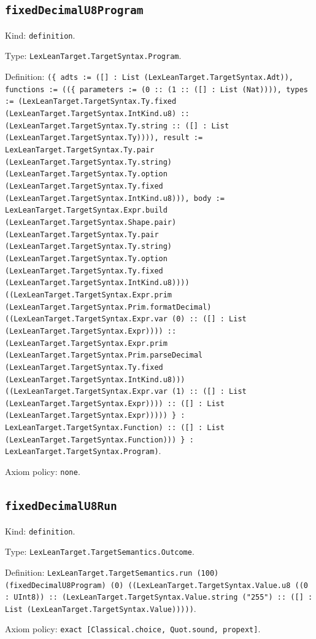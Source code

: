 \documentclass[11pt]{article}
\begin{document}
\subsection*{\texttt{fixedDecimalU8Program}}
\noindent Kind: \texttt{definition}.\par
\noindent Type: \texttt{LexLeanTarget.TargetSyntax.Program}.\par
\noindent Definition: \texttt{(\{ adts := ([] : List (LexLeanTarget.TargetSyntax.Adt)), functions := ((\{ parameters := (0 :: (1 :: ([] : List (Nat)))), types := (LexLeanTarget.TargetSyntax.Ty.fixed (LexLeanTarget.TargetSyntax.IntKind.u8) :: (LexLeanTarget.TargetSyntax.Ty.string :: ([] : List (LexLeanTarget.TargetSyntax.Ty)))), result := LexLeanTarget.TargetSyntax.Ty.pair (LexLeanTarget.TargetSyntax.Ty.string) (LexLeanTarget.TargetSyntax.Ty.option (LexLeanTarget.TargetSyntax.Ty.fixed (LexLeanTarget.TargetSyntax.IntKind.u8))), body := LexLeanTarget.TargetSyntax.Expr.build (LexLeanTarget.TargetSyntax.Shape.pair) (LexLeanTarget.TargetSyntax.Ty.pair (LexLeanTarget.TargetSyntax.Ty.string) (LexLeanTarget.TargetSyntax.Ty.option (LexLeanTarget.TargetSyntax.Ty.fixed (LexLeanTarget.TargetSyntax.IntKind.u8)))) ((LexLeanTarget.TargetSyntax.Expr.prim (LexLeanTarget.TargetSyntax.Prim.formatDecimal) ((LexLeanTarget.TargetSyntax.Expr.var (0) :: ([] : List (LexLeanTarget.TargetSyntax.Expr)))) :: (LexLeanTarget.TargetSyntax.Expr.prim (LexLeanTarget.TargetSyntax.Prim.parseDecimal (LexLeanTarget.TargetSyntax.Ty.fixed (LexLeanTarget.TargetSyntax.IntKind.u8))) ((LexLeanTarget.TargetSyntax.Expr.var (1) :: ([] : List (LexLeanTarget.TargetSyntax.Expr)))) :: ([] : List (LexLeanTarget.TargetSyntax.Expr))))) \} : LexLeanTarget.TargetSyntax.Function) :: ([] : List (LexLeanTarget.TargetSyntax.Function))) \} : LexLeanTarget.TargetSyntax.Program)}.\par
\noindent Axiom policy: \texttt{none}.\par
\subsection*{\texttt{fixedDecimalU8Run}}
\noindent Kind: \texttt{definition}.\par
\noindent Type: \texttt{LexLeanTarget.TargetSemantics.Outcome}.\par
\noindent Definition: \texttt{LexLeanTarget.TargetSemantics.run (100) (fixedDecimalU8Program) (0) ((LexLeanTarget.TargetSyntax.Value.u8 ((0 : UInt8)) :: (LexLeanTarget.TargetSyntax.Value.string ("255") :: ([] : List (LexLeanTarget.TargetSyntax.Value)))))}.\par
\noindent Axiom policy: \texttt{exact [Classical.choice, Quot.sound, propext]}.\par
\end{document}
